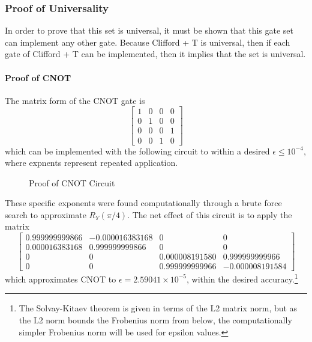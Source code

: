 \documentclass[12pt]{article}
\begin{document}
\subsubsection{Proof of Universality}
In order to prove that this set is universal, it must be shown that this gate set can implement any other gate. Because Clifford + T is universal, then if each gate of Clifford + T can be implemented, then it implies that the set is universal.

\paragraph{Proof of CNOT}
The matrix form of the CNOT gate is
$$
\begin{bmatrix}
    1&0&0&0\\
    0&1&0&0\\
    0&0&0&1\\
    0&0&1&0
\end{bmatrix}
$$
which can be implemented with the following circuit to within a desired $\epsilon \le 10^{-4}$, where expnents represent repeated application.

\begin{figure}[h]
    \centering
    \caption{Proof of CNOT Circuit}
    \label{fig:quantum universal set 1 proof of CNOT circuit numerical}
\end{figure}

These specific exponents were found computationally through a brute force search to approximate $R_Y(\pi / 4)$. The net effect of this circuit is to apply the matrix
$$
\begin{bmatrix}
    0.999999999866&-0.000016383168&0&0\\
    0.000016383168& 0.999999999866&0&0\\
    0&0&0.000008191580& 0.999999999966\\
    0&0&0.999999999966&-0.000008191584
\end{bmatrix}
$$
which approximates CNOT to $\epsilon = 2.59041 \times 10^{-5}$, within the desired accuracy.\footnote{The Solvay-Kitaev theorem is given in terms of the L2 matrix norm, but as the L2 norm bounds the Frobenius norm from below, the computationally simpler Frobenius norm will be used for epsilon values.}
\end{document}
